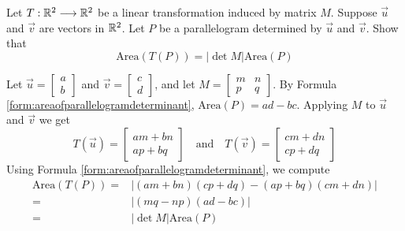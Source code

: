 \documentclass{ximera}
\begin{document}
    \begin{example}\label{ex:detLinTransArea}
        Let $T:\mathbb{R}^2\longrightarrow\mathbb{R}^2$ be a linear transformation induced by matrix $M$.  Suppose $\vec{u}$ and $\vec{v}$ are vectors in $\mathbb{R}^2$.  Let $P$ be a parallelogram determined by $\vec{u}$ and $\vec{v}$.  Show that
        $$\mbox{Area}(T(P))=\left|\det{M}\right|\mbox{Area}(P)$$
        \begin{explanation}
            Let $\vec{u}=\begin{bmatrix}a\\b\end{bmatrix}$ and $\vec{v}=\begin{bmatrix}c\\d\end{bmatrix}$, and let $M=\begin{bmatrix}m & n\\p & q\end{bmatrix}$.  By Formula \ref{form:areaofparallelogramdeterminant}, $\mbox{Area}(P)=ad-bc$.  Applying $M$ to $\vec{u}$ and $\vec{v}$ we get
            $$T(\vec{u})=\begin{bmatrix}am+bn\\ap+bq\end{bmatrix}\quad\mbox{and}\quad T(\vec{v})=\begin{bmatrix}cm+dn\\cp+dq\end{bmatrix}$$
            Using Formula \ref{form:areaofparallelogramdeterminant}, we compute
            \begin{align*}
            \mbox{Area}(T(P))=&|(am+bn)(cp+dq)-(ap+bq)(cm+dn)|\\
            =&|(mq-np)(ad-bc)|\\
            =&|\det{M}|\mbox{Area}(P)
            \end{align*}
        \end{explanation}
    \end{example}
     
\end{document}
